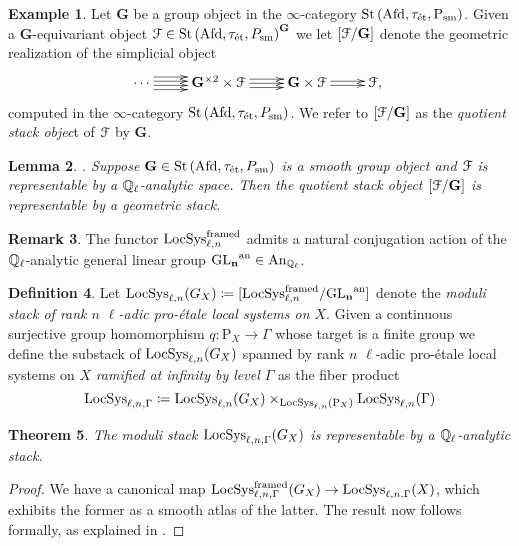 \documentclass[10pt,a4paper]{amsart}
\numberwithin{equation}{subsection}
\theoremstyle{plain}
\newtheorem{theorem}{Theorem}[section]
\newtheorem{lemma}[theorem]{Lemma}
\theoremstyle{definition}
\newtheorem{defi}[theorem]{Definition}
\newtheorem{exem}[theorem]{Example}
\newtheorem{rema}[theorem]{Remark}
\theoremstyle{remark}
\numberwithin{equation}{section}
\begin{document}
\begin{exem}
Let $\mathbf G$ be a group object in the $\infty$-category $\mathrm{St} \left( \mathrm{Afd}, \tau_{\text{\'et}}, \mathrm P_{\mathrm{sm}} \right)$. Given a $\mathbf G$-equivariant object $\mathcal{F} \in \mathrm{St} \left( \mathrm{Afd}, \tau_{\text{\'et}}, P_{\mathrm{sm}} \right)^{\mathbf G}$ we let $[\mathcal{F} / \mathbf G ]$ denote the geometric
realization of the simplicial object
	\[
	\xymatrix{
 		\cdots \ar[r]<1.5pt>\ar[r]<-1.5pt>\ar[r]<4.5pt>\ar[r]<-4.5pt> &\mathbf G^{\times 2} \times \cF   \ar[r]<3pt>\ar[r]\ar[r]<-3pt>  & 
		\mathbf G \times \cF \ar[r]<1.5pt>\ar[r]<-1.5pt> & \cF,\ 
	}\]
computed in the $\infty$-category $\mathrm{St} \left( \mathrm{Afd}, \tau_{\text{\'et}}, P_{\mathrm{sm}} \right)$. We refer to $[\mathcal{F} / \mathbf G ]$ as the \emph{quotient stack objec}t of $\mathcal{F}$ by $\mathbf G$. 
\end{exem}

\begin{lemma}{\cite[Section 2.3]{me1}.}
Suppose $ \mathbf G \in \mathrm{St} \left( \mathrm{Afd}, \tau_{\text{\'et}}, P_{\mathrm{sm}} \right) $ is a smooth group object and $\mathcal{F} $ is representable by a $\mathbb{Q}_{\ell}$-analytic space. Then the quotient stack object $[\mathcal{F}/ \mathbf G]$ is representable by a geometric stack.
\end{lemma}
%
\begin{rema}
The functor $\mathrm{LocSys}_{\ell, n}^{\mathrm{framed}}$ admits a natural conjugation action of the $\mathbb{Q}_\ell$-analytic general linear group $ \mathbf {\mathrm{GL}_n}^{\mathrm{an}}  \in \mathrm{An}_{\mathbb{Q}_\ell}$. 
\end{rema}

\begin{defi}
Let $\mathrm{LocSys}_{\ell, n}(G_X) \coloneqq [\mathrm{LocSys}_{\ell, n}^{\mathrm{framed}} / \mathbf {\mathrm{GL}_n}^{\mathrm{an}}]$ denote the \emph{moduli stack of rank $n$ $\ell$-adic pro-\'etale local systems on $X$}. Given a continuous surjective group homomorphism $q \colon \mathrm P_X \to \Gamma$ whose
target is a finite group we define the substack of $\mathrm{LocSys}_{\ell, n}(G_X)$ spanned by rank $n$ $\ell$-adic pro-\'etale local systems on $X$ \emph{ramified at infinity by level $\Gamma$} as the fiber product
	\[
		\mathrm{LocSys}_{\ell, n, \Gamma} \coloneqq \mathrm{LocSys}_{\ell, n}(G_X) \times_{\mathrm{LocSys}_{\ell, n} ( \mathrm P_X)} \mathrm{LocSys}_{\ell, n}(\Gamma)
	\]
\end{defi}

\begin{theorem} \label{main1}
The moduli stack $\mathrm{LocSys}_{\ell, n, \Gamma}(G_X)$ is representable by a $\mathbb{Q}_{\ell}$-analytic stack.
\end{theorem}

\begin{proof}
We have a canonical map $ \mathrm{LocSys}_{\ell, n, \Gamma}^{\mathrm{framed}}(G_X)\to \mathrm{LocSys}_{\ell, n, \Gamma}(X)$, which exhibits the former as a smooth atlas of the latter. The result now follows formally, as explained in \cite[section 2.3]{me1}.
\end{proof}
\end{document}
